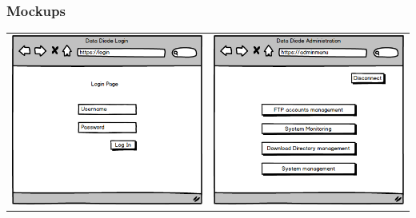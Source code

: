 \documentclass[a4paper,11pt]{article}
\begin{document}
\subsubsection{Mockups}
\begin{center}
\begin{tabular}{cc}
\includegraphics[scale=0.5]{img/Login.png} & \includegraphics[scale=0.5]{img/menu.png}\\

\end{tabular}
\end{center}
\end{document}
